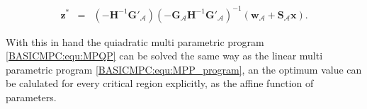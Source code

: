     \begin{equation}
    \begin{array}{rcl}
            \textbf{z}^*&=&(-\textbf{H}^{-1}\textbf{G}'_{\mathcal{A}})(-\textbf{G}_{\mathcal{A}}\textbf{H}^{-1}\textbf{G}'_{\mathcal{A}})^{-1}(\textbf{w}_{\mathcal{A}}+\textbf{S}_{\mathcal{A}}\textbf{x}).
            \end{array}
        \label{BASICMPC:equ:MPQP_optimizer}
    \end{equation}

    With this in hand the quiadratic multi parametric program \ref{BASICMPC:equ:MPQP} can be solved the same way as the linear multi parametric program \ref{BASICMPC:equ:MPP_program}, an the optimum value can be calulated for every critical region explicitly, as the affine function of parameters.

